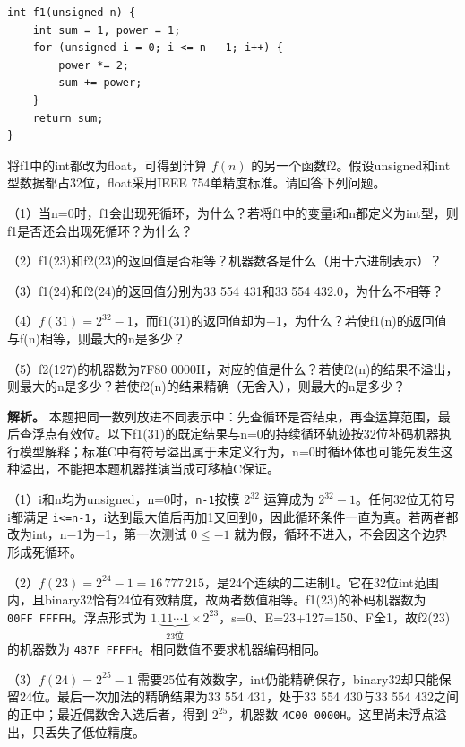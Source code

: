 \par\medskip\noindent
\begin{minipage}{\linewidth}
\begin{verbatim}
int f1(unsigned n) {
    int sum = 1, power = 1;
    for (unsigned i = 0; i <= n - 1; i++) {
        power *= 2;
        sum += power;
    }
    return sum;
}
\end{verbatim}
\end{minipage}\par\medskip

将f1中的int都改为float，可得到计算 \(f(n)\) 的另一个函数f2。假设unsigned和int型数据都占32位，float采用IEEE 754单精度标准。请回答下列问题。

（1）当n=0时，f1会出现死循环，为什么？若将f1中的变量i和n都定义为int型，则f1是否还会出现死循环？为什么？

（2）f1(23)和f2(23)的返回值是否相等？机器数各是什么（用十六进制表示）？

（3）f1(24)和f2(24)的返回值分别为33 554 431和33 554 432.0，为什么不相等？

（4）\(f(31)=2^{32}-1\)，而f1(31)的返回值却为−1，为什么？若使f1(n)的返回值与f(n)相等，则最大的n是多少？

（5）f2(127)的机器数为7F80 0000H，对应的值是什么？若使f2(n)的结果不溢出，则最大的n是多少？若使f2(n)的结果精确（无舍入），则最大的n是多少？


\textbf{解析。} 本题把同一数列放进不同表示中：先查循环是否结束，再查运算范围，最后查浮点有效位。以下f1(31)的既定结果与n=0的持续循环轨迹按32位补码机器执行模型解释；标准C中有符号溢出属于未定义行为，n=0时循环体也可能先发生这种溢出，不能把本题机器推演当成可移植C保证。

（1）i和n均为unsigned，n=0时，\texttt{n-1}按模 \(2^{32}\) 运算成为 \(2^{32}-1\)。任何32位无符号i都满足 \texttt{i\textless{}=n-1}，i达到最大值后再加1又回到0，因此循环条件一直为真。若两者都改为int，n−1为−1，第一次测试 \(0\le-1\) 就为假，循环不进入，不会因这个边界形成死循环。

（2）\(f(23)=2^{24}-1=16\,777\,215\)，是24个连续的二进制1。它在32位int范围内，且binary32恰有24位有效精度，故两者数值相等。f1(23)的补码机器数为 \texttt{00FF\ FFFFH}。浮点形式为 \(1.\underbrace{11\cdots1}_{23\text{位}}\times2^{23}\)，s=0、E=23+127=150、F全1，故f2(23)的机器数为 \texttt{4B7F\ FFFFH}。相同数值不要求机器编码相同。

（3）\(f(24)=2^{25}-1\) 需要25位有效数字，int仍能精确保存，binary32却只能保留24位。最后一次加法的精确结果为33 554 431，处于33 554 430与33 554 432之间的正中；最近偶数舍入选后者，得到 \(2^{25}\)，机器数 \texttt{4C00\ 0000H}。这里尚未浮点溢出，只丢失了低位精度。

